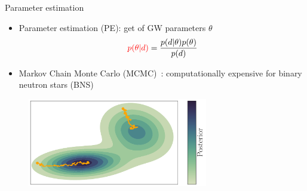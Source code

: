 \documentclass[usenames,dvipsnames,t]{beamer}
\begin{document}
\begin{frame}{Parameter estimation}

\def\x{3mm}
\def\y{2mm}

\begin{itemize}
    \item Parameter estimation (PE): get  of GW parameters $\theta$ %
    \begin{equation*}
        \textcolor{red}{p(\theta | d)} = \frac{p(d | \theta) p(\theta)}{p(d)}
    \end{equation*}

    \vspace{\y}

    \item Markov Chain Monte Carlo (MCMC)~\cite{brooks2011handbook}: computationally expensive for binary neutron stars (BNS)
    
\end{itemize}


\begin{figure}
  \centering
  \includegraphics[width=0.7\textwidth]{Figures/mixture_of_gaussians_projection_no_title_colorbar.pdf}
\end{figure}

\end{frame}
\end{document}
